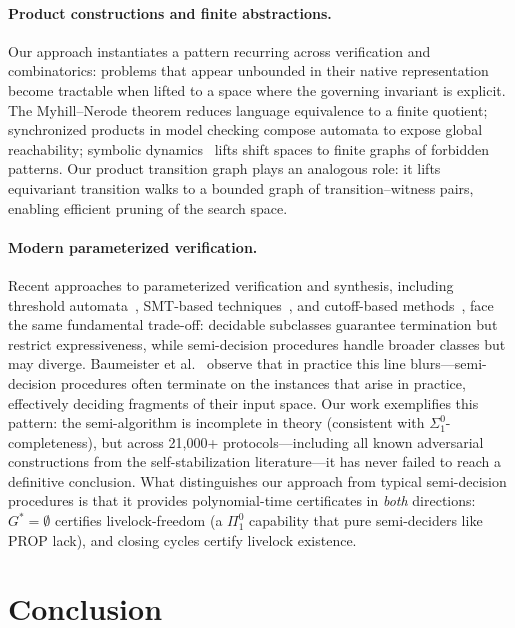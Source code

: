 \documentclass[11pt]{article}
\begin{document}
\paragraph{Product constructions and finite abstractions.} Our approach instantiates a pattern recurring across verification and combinatorics: problems that appear unbounded in their native representation become tractable when lifted to a space where the governing invariant is explicit. The Myhill--Nerode theorem reduces language equivalence to a finite quotient; synchronized products in model checking compose automata to expose global reachability; symbolic dynamics~\cite{lind-marcus} lifts shift spaces to finite graphs of forbidden patterns. Our product transition graph plays an analogous role: it lifts equivariant transition walks to a bounded graph of transition--witness pairs, enabling efficient pruning of the search space.

\paragraph{Modern parameterized verification.} Recent approaches to parameterized verification and synthesis, including threshold automata~\cite{baumeister-jacobs}, SMT-based techniques~\cite{mirzaie-bonakdarpour}, and cutoff-based methods~\cite{bloem-survey}, face the same fundamental trade-off: decidable subclasses guarantee termination but restrict expressiveness, while semi-decision procedures handle broader classes but may diverge. Baumeister et al.~\cite{baumeister-jacobs} observe that in practice this line blurs---semi-decision procedures often terminate on the instances that arise in practice, effectively deciding fragments of their input space. Our work exemplifies this pattern: the semi-algorithm is incomplete in theory (consistent with $\Sigma^0_1$-completeness), but across 21{,}000+ protocols---including all known adversarial constructions from the self-stabilization literature---it has never failed to reach a definitive conclusion. What distinguishes our approach from typical semi-decision procedures is that it provides polynomial-time certificates in \emph{both} directions: $G^* = \emptyset$ certifies livelock-freedom (a $\Pi^0_1$ capability that pure semi-deciders like PROP lack), and closing cycles certify livelock existence.

\section{Conclusion}
\label{sec:conclusion}
\end{document}
